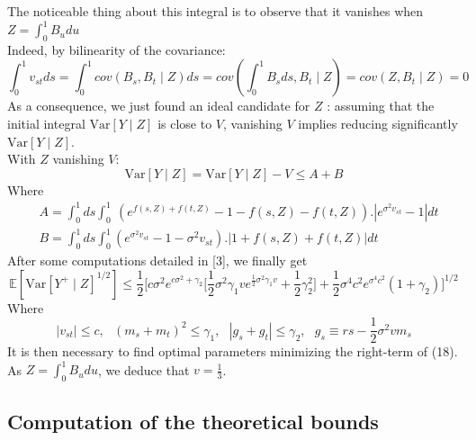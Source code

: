 \documentclass{article}
\begin{document}
The noticeable thing about this integral is to observe that it vanishes when $Z=\int_{0}^{1}B_u du$\\
Indeed, by bilinearity of the covariance:\\
\begin{equation}
    \int_{0}^{1}v_{st}ds=\int_{0}^{1}cov(B_s,B_t\mid Z)ds=cov(\int_{0}^{1}B_s ds,B_t\mid Z)=cov(Z,B_t\mid Z)=0
\end{equation}
As a consequence, we just found an ideal candidate for $Z$ : assuming that the initial integral $\mathrm{Var}[Y\mid Z]$ is close to $V$, vanishing $V$ implies reducing significantly $\mathrm{Var}[Y\mid Z]$.\\
With $Z$ vanishing $V$:
\begin{equation}
  \mathrm{Var}[Y\mid Z]= \mathrm{Var}[Y\mid Z]-V\leq A+B 
\end{equation}
Where 
\begin{equation}
    \begin{aligned}
    &A=\int_{0}^{1}d s\int_{0}^{1}\ (e^{f(s,Z)+f(t,Z)}-1-f(s,Z)-f(t,Z)).|e^{\sigma^{2}v_{s t}}-1|d t\\
    &B=\int_{0}^{1}d s\int_{0}^{1}(e^{\sigma^{2}v_{s t}}-1-\sigma^{2}v_{s t}).|1+f(s,Z)+f(t,Z)|d t
    \end{aligned}
\end{equation}
After some computations detailed in [3], we finally get
\begin{equation}
    \mathbb{E}[\mathrm{Var}[Y^{+}\mid Z]^{1/2}] \leq \frac{1}{2}\Biggl[c\sigma^{2}e^{c\sigma^{2}+\gamma_{2}}\biggl[\frac{1}{2}\sigma^{2}\gamma_{1}v e^{{\frac{1}{2}}\sigma^{2}\gamma_{1}v}+{\textstyle{\frac{1}{2}}}\gamma_{2}^{2}\biggr]+{\textstyle{\frac{1}{2}}}\sigma^{4}c^{2}e^{\sigma^{4}c^{2}}(1+\gamma_{2})\Biggr]^{1/2}
\end{equation}
Where 
\begin{equation}
    |v_{s t}|\leq c,\ \ \ (m_{s}+m_{t})^{2}\leq\gamma_{1},\ \ \ |g_{s}+g_{t}|\leq\gamma_{2} ,\ \ \ 
    g_s\equiv r s-\textstyle{\frac{1}{2}}\sigma^{2}v m_{s}
\end{equation}
It is then necessary to find optimal parameters minimizing the right-term of (18). \\
As $Z=\int_{0}^{1}B_u du$, we deduce that $v=\frac{1}{3}$.

\subsection{Computation of the theoretical bounds}
\end{document}
